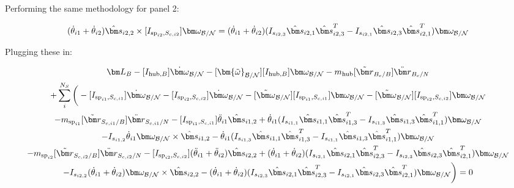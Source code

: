 Performing the same methodology for panel 2:

\begin{equation}
	(\dot{\theta}_{i1}  + \dot{\theta}_{i2})\hat{\bm s}_{i2,2} \times [I_{\text{sp}_{i2},S_{c,i2}}] \bm \omega_{\cal{B/N}} = (\dot{\theta}_{i1}  + \dot{\theta}_{i2}) (I_{s_{i2,3}} \hat{\bm s}_{i2,1} \hat{\bm s}_{i2,3}^T - I_{s_{i2,1}} \hat{\bm s}_{i2,3} \hat{\bm s}_{i2,1}^T) \bm \omega_{\cal{B/N}}
\end{equation}

Plugging these in:

\begin{multline}
	\bm L_B -[I_{\text{hub},B}] \dot{\bm\omega}_{\cal B/N}  -[\bm{\tilde{\omega}}_{\cal B/N}] [I_{\text{hub},B}] \bm\omega_{\cal B/N} - m_{\text{hub}} [\tilde{{\bm r}}_{B_c/B}] \ddot{\bm r}_{B_c/N} \\
	+ \sum\limits_{i}^{N_S}\bigg(-[I_{\text{sp}_{i1},S_{c,i1}}] \dot{\bm \omega}_{\cal{B/N}} -[I_{\text{sp}_{i2},S_{c,i2}}] \dot{\bm \omega}_{\cal{B/N}} -[\tilde{\bm \omega}_{\cal{B/N}}] [I_{\text{sp}_{i1},S_{c,i1}}] \bm \omega_{\cal{B/N}}-[\tilde{\bm \omega}_{\cal{B/N}}] [I_{\text{sp}_{i2},S_{c,i2}}] \bm \omega_{\cal{B/N}}\\
	- m_{\text{sp}_{i1}} [\tilde{{\bm r}}_{S_{c,i1}/B}] \ddot{\bm r}_{S_{c,i1}/N} -[I_{\text{sp}_{i1},S_{c,i1}}] \ddot{\theta}_{i1} \hat{\bm s}_{i1,2} +\dot{\theta}_{i1} (I_{s_{i1,1}} \hat{\bm s}_{i1,1} \hat{\bm s}_{i1,3}^T - I_{s_{i1,3}} \hat{\bm s}_{i1,3} \hat{\bm s}_{i1,1}^T) \bm \omega_{\cal{B/N}}\\
	-I_{s_{i1,2}} \dot{\theta}_{i1} \bm \omega_{\cal{B/N}} \times \hat{\bm s}_{i1,2} -\dot{\theta}_{i1} (I_{s_{i1,3}} \hat{\bm s}_{i1,1} \hat{\bm s}_{i1,3}^T - I_{s_{i1,1}} \hat{\bm s}_{i1,3} \hat{\bm s}_{i1,1}^T) \bm \omega_{\cal{B/N}}\\
	- m_{\text{sp}_{i2}} [\tilde{{\bm r}}_{S_{c,i2}/B}] \ddot{\bm r}_{S_{c,i2}/N} -[I_{\text{sp}_{i2},S_{c,i2}}] (\ddot{\theta}_{i1}  + \ddot{\theta}_{i2})\hat{\bm s}_{i2,2} +(\dot{\theta}_{i1}  + \dot{\theta}_{i2}) (I_{s_{i2,1}} \hat{\bm s}_{i2,1} \hat{\bm s}_{i2,3}^T - I_{s_{i2,3}} \hat{\bm s}_{i2,3} \hat{\bm s}_{i2,1}^T) \bm \omega_{\cal{B/N}} \\
	-I_{s_{i2,2}}  (\dot{\theta}_{i1}  + \dot{\theta}_{i2}) \bm \omega_{\cal{B/N}} \times \hat{\bm s}_{i2,2} -(\dot{\theta}_{i1}  + \dot{\theta}_{i2}) (I_{s_{i2,3}} \hat{\bm s}_{i2,1} \hat{\bm s}_{i2,3}^T - I_{s_{i2,1}} \hat{\bm s}_{i2,3} \hat{\bm s}_{i2,1}^T) \bm \omega_{\cal{B/N}}\bigg) = 0
\end{multline}

